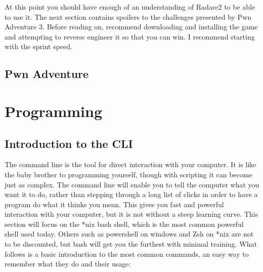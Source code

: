 \documentclass[a4paper,11pt]{report}
\begin{document}
			At this point you should have enough of an understanding of Radare2 to be able to use it. 
			The next section contains spoilers to the challenges presented by Pwn Adventure 3. 
			Before reading on, recommend downloading and installing the game and attempting to reverse engineer it so that you can win. 
			I recommend starting with the sprint speed. 
	\section{Pwn Adventure}
\chapter{Programming}
	\label{ch:Programming}
	\section{Introduction to the CLI}
		The command line is the tool for direct interaction with your computer. 
		It is like the baby brother to programming yourself, though with scripting it can become just as complex. 
		The command line will enable you to tell the computer what you want it to do, rather than stepping through a long list of clicks in order to have a program do what it thinks you mean. 
		This gives you fast and powerful interaction with your computer, but it is not without a steep learning curve. 
		This section will focus on the \**nix bash shell, which is the most common powerful shell used today. 
		Others such as powershell on windows and Zsh on \**nix are not to be discounted, but bash will get you the furthest with minimal training.\cite{CLICrashCourse}
		What follows is a basic introduction to the most common commands, an easy way to remember what they do and their usage:
\end{document}
